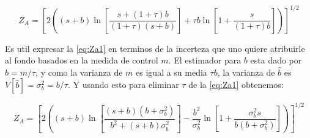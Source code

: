 \begin{equation}
  Z_A = \left[ 2 \left( (s+b) \ln \left[ \frac{s+(1+\tau)b}{(1+\tau)(s+b)} \right] + \tau b  \ln \left[ 1 + \frac{s}{(1+\tau)b} \right] \right) \right]^{1/2}
  \label{eq:Za1}
\end{equation}

Es util expresar la {\eq} \eqref{eq:Za1} en terminos de la incerteza que uno quiere
atribuirle al fondo basados en la medida de control $m$. El estimador para $b$ esta dado
por $\hat{b} = m/\tau$, y como la varianza de $m$ es igual a su media $\tau b$, la
varianza de $\hat{b}$ es $V[\hat{b}] = \sigma_b^2 = b/\tau$. Y usando esto para eliminar
$\tau$ de la {\eq} \eqref{eq:Za1} obtenemos:

\begin{equation}
  Z_A = \left[ 2 \left( (s+b) \ln \left[ \frac{(s+b)(b+\sigma_b^2)}{b^2+(s+b)\sigma_b^2} \right] - \frac{b^2}{\sigma_b^2} \ln \left[ 1 + \frac{\sigma_b^2 s}{b(b+\sigma_b^2)} \right] \right) \right]^{1/2}
  \label{eq:Za}
\end{equation}






